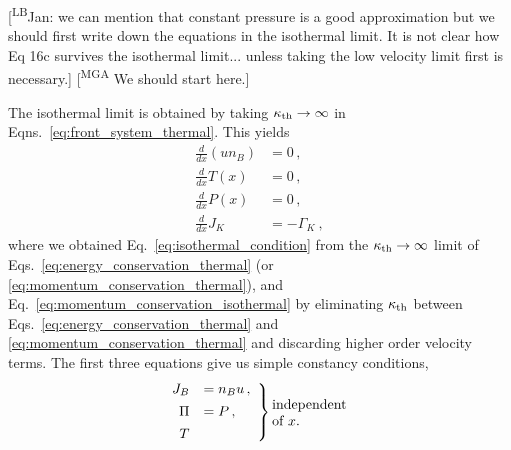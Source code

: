 \documentclass[10pt,superscriptaddress,
amsmath,aps,prc,twocolumn,nofootinbib,floatfix]{revtex4-1}
\newcommand{\mga}[1]{{\color[rgb]{0.6,0,0}#1}}
\newcommand{\mgacom}[1]{\textsf{\color[rgb]{0.8,0,0}[\textsuperscript{MGA} #1]}}
\newcommand{\LBcom}[1]{\textsf{\color{blue}[\textsuperscript{LB}#1]}}
\begin{document}
\LBcom{Jan: we can mention that constant pressure is a good approximation but we should first write down the equations in the isothermal limit. It is not clear how Eq 16c survives the isothermal limit... unless taking the low velocity limit first is necessary.}
\mgacom{We should start here.}

\mga{The isothermal limit is obtained by taking
$\kappa_{\rm th}\to\infty$ in Eqns.~\ref{eq:front_system_thermal}.
This yields}
\begin{subequations}\label{eq:front_system_isothermal}
\begin{align}
\frac{d}{dx}(u n_B)&= 0\,, 
\label{eq:baryon_conservation_isothermal}\\
\frac{d}{dx}T(x) &=0\,,
\label{eq:isothermal_condition}\\
\frac{d}{dx} P(x) &=0\,,
 \label{eq:momentum_conservation_isothermal}\\
 \frac{d}{dx}J_K &= -\Gamma_K\ ,
    \label{eq:K_conservation_isothermal}
\end{align}
\end{subequations}
\mga{where we obtained Eq.~\eqref{eq:isothermal_condition} from the $\kappa_{\rm th}\to\infty$ limit of Eqs.~\eqref{eq:energy_conservation_thermal} (or 
\eqref{eq:momentum_conservation_thermal}), and Eq.~\eqref{eq:momentum_conservation_isothermal} by eliminating $\kappa_{\rm th}$ between 
Eqs.~\eqref{eq:energy_conservation_thermal} and
\eqref{eq:momentum_conservation_thermal} and discarding higher order velocity terms.}
%
\mga{The first three equations give us simple constancy conditions,}
\begin{equation}
\left.
\begin{array}{rl}
 J_B &=n_Bu \,, \\[1ex]
 \Pi &=P \,,\\[1ex]
 T
\end{array}
\right\}\parbox{6em}{independent of $x$.}
\label{eq:conserved_fluxes}
\end{equation}
\end{document}
